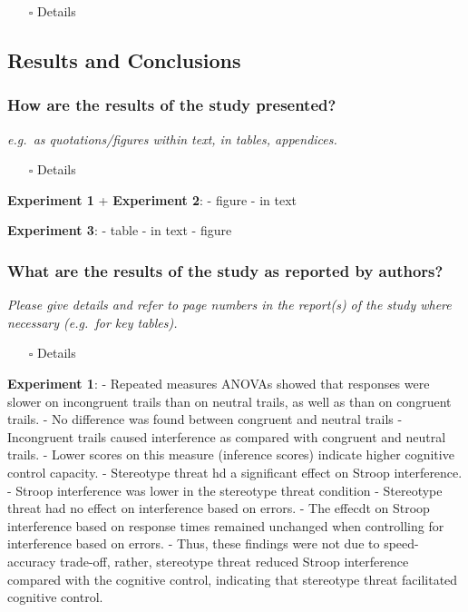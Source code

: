 \documentclass[
  doc, a4paper]{apa7}
\providecommand{\tightlist}{%
  \setlength{\itemsep}{0pt}\setlength{\parskip}{0pt}}
\begin{document}
\begin{itemize}
\tightlist
\item[$\square$]
  Details
\end{itemize}

\subsection{Results and Conclusions}\label{results-and-conclusions}

\subsubsection{How are the results of the study presented?}\label{how-are-the-results-of-the-study-presented}

\emph{e.g.~as quotations/figures within text, in tables, appendices.}

\begin{itemize}
\tightlist
\item[$\square$]
  Details
\end{itemize}

\textbf{Experiment 1} + \textbf{Experiment 2}:
- figure
- in text

\textbf{Experiment 3}:
- table
- in text
- figure

\subsubsection{What are the results of the study as reported by authors?}\label{what-are-the-results-of-the-study-as-reported-by-authors}

\emph{Please give details and refer to page numbers in the report(s) of the study where necessary (e.g.~for key tables).}

\begin{itemize}
\tightlist
\item[$\square$]
  Details
\end{itemize}

\textbf{Experiment 1}:
- Repeated measures ANOVAs showed that responses were slower on incongruent trails than on neutral trails, as well as than on congruent trails.
- No difference was found between congruent and neutral trails
- Incongruent trails caused interference as compared with congruent and neutral trails.
- Lower scores on this measure (inference scores) indicate higher cognitive control capacity.
- Stereotype threat hd a significant effect on Stroop interference.
- Stroop interference was lower in the stereotype threat condition
- Stereotype threat had no effect on interference based on errors.
- The effecdt on Stroop interference based on response times remained unchanged when controlling for interference based on errors.
- Thus, these findings were not due to speed-accuracy trade-off, rather, stereotype threat reduced Stroop interference compared with the cognitive control, indicating that stereotype threat facilitated cognitive control.
\end{document}
